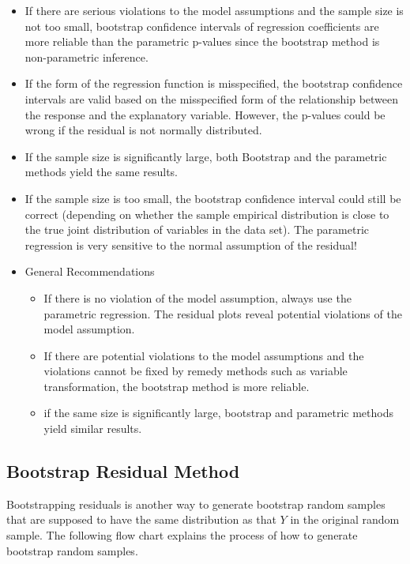 \documentclass[
]{book}
\begin{document}
\begin{itemize}
\item
  If there are serious violations to the model assumptions and the sample size is not too small, bootstrap confidence intervals of regression coefficients are more reliable than the parametric p-values since the bootstrap method is non-parametric inference.
\item
  If the form of the regression function is misspecified, the bootstrap confidence intervals are valid based on the misspecified form of the relationship between the response and the explanatory variable. However, the p-values could be wrong if the residual is not normally distributed.
\item
  If the sample size is significantly large, both Bootstrap and the parametric methods yield the same results.
\item
  If the sample size is too small, the bootstrap confidence interval could still be correct (depending on whether the sample empirical distribution is close to the true joint distribution of variables in the data set). The parametric regression is very sensitive to the normal assumption of the residual!
\item
  General Recommendations

  \begin{itemize}
  \item
    If there is no violation of the model assumption, always use the parametric regression. The residual plots reveal potential violations of the model assumption.
  \item
    If there are potential violations to the model assumptions and the violations cannot be fixed by remedy methods such as variable transformation, the bootstrap method is more reliable.
  \item
    if the same size is significantly large, bootstrap and parametric methods yield similar results.
  \end{itemize}
\end{itemize}

\hypertarget{bootstrap-residual-method}{%
\subsection{Bootstrap Residual Method}\label{bootstrap-residual-method}}

Bootstrapping residuals is another way to generate bootstrap random samples that are supposed to have the same distribution as that \(Y\) in the original random sample. The following flow chart explains the process of how to generate bootstrap random samples.
\end{document}
